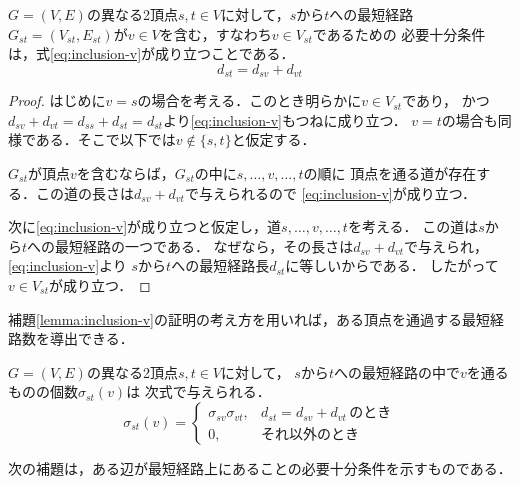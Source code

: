 \begin{lemma}
  \label{lemma:inclusion-v}
  $G=(V,E)$の異なる2頂点$s,t \in V$に対して，$s$から$t$への最短経路
  $G_{st}=(V_{st},E_{st})$が$v\in V$を含む，すなわち$v\in V_{st}$であるための
  必要十分条件は，式\eqref{eq:inclusion-v}が成り立つことである．
  \begin{equation}
    d_{st}=d_{sv}+d_{vt}
    \label{eq:inclusion-v}
  \end{equation}
\end{lemma}
\begin{proof}
  はじめに$v=s$の場合を考える．このとき明らかに$v \in V_{st}$であり，
  かつ$d_{sv}+d_{vt}=d_{ss}+d_{st}=d_{st}$より\eqref{eq:inclusion-v}もつねに成り立つ．
  $v=t$の場合も同様である．そこで以下では$v \not\in \{s,t\}$と仮定する．

  $G_{st}$が頂点$v$を含むならば，$G_{st}$の中に$s,\ldots,v,\ldots,t$の順に
  頂点を通る道が存在する．この道の長さは$d_{sv}+d_{vt}$で与えられるので
  \eqref{eq:inclusion-v}が成り立つ．

  次に\eqref{eq:inclusion-v}が成り立つと仮定し，道$s,\ldots,v,\ldots,t$を考える．
  この道は$s$から$t$への最短経路の一つである．
  なぜなら，その長さは$d_{sv}+d_{vt}$で与えられ，\eqref{eq:inclusion-v}より
  $s$から$t$への最短経路長$d_{st}$に等しいからである．
  したがって$v\in V_{st}$が成り立つ．
\end{proof}

補題\ref{lemma:inclusion-v}の証明の考え方を用いれば，ある頂点を通過する最短経路数を導出できる．

\begin{lemma}
  $G=(V,E)$の異なる2頂点$s,t \in V$に対して，
  $s$から$t$への最短経路の中で$v$を通るものの個数$\sigma_{st}(v)$は
  次式で与えられる．
  \begin{equation}
    \sigma_{st}(v)=
    \begin{cases}
      \sigma_{sv} \sigma_{vt}, & d_{st}=d_{sv}+d_{vt}\,\text{のとき} \\
      0, & \text{それ以外のとき}
    \end{cases}
  \end{equation}
\end{lemma}

次の補題は，ある辺が最短経路上にあることの必要十分条件を示すものである．

